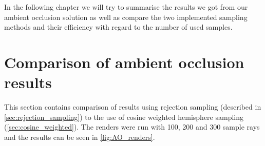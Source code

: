 In the following chapter we will try to summarise the results we got from our ambient occlusion solution as well as compare the two implemented sampling methods and their efficiency with regard to the number of used samples.
\section{Comparison of ambient occlusion results}
This section contains comparison of results using rejection sampling (described in \autoref{sec:rejection_sampling}) to the use of cosine weighted hemisphere sampling (\autoref{sec:cosine_weighted}). The renders were run with 100, 200 and 300 sample rays and the results can be seen in \autoref{fig:AO_renders}.

\begin{figure}[h!]
	\centering
    	\\

\end{figure}
